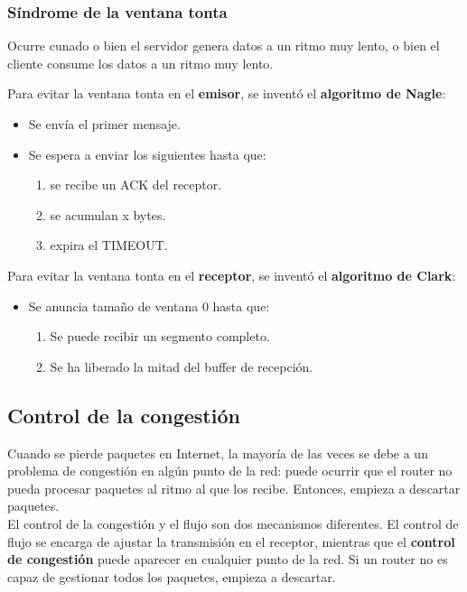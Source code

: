\subsubsection{Síndrome de la ventana tonta}
Ocurre cunado o bien el servidor genera datos a un ritmo muy lento, o bien el cliente consume los datos a un ritmo muy lento.\\
\begin{tcolorbox}[colback=white]
Para evitar la ventana tonta en el \textbf{emisor}, se inventó el \textbf{algoritmo de Nagle}:
\begin{itemize}
    \item Se envía el primer mensaje.
    \item Se espera a enviar los siguientes hasta que:
    \begin{enumerate}
        \item se recibe un ACK del receptor.
        \item se acumulan x bytes.
        \item expira el TIMEOUT.
    \end{enumerate}
\end{itemize}
\end{tcolorbox}
\begin{tcolorbox}[colback=white]
Para evitar la ventana tonta en el \textbf{receptor}, se inventó el \textbf{algoritmo de Clark}:
\begin{itemize}
    \item Se anuncia tamaño de ventana 0 hasta que:
    \begin{enumerate}
        \item Se puede recibir un segmento completo.
        \item Se ha liberado la mitad del buffer de recepción.
    \end{enumerate}
\end{itemize}
\end{tcolorbox}


\subsection{Control de la congestión}
Cuando se pierde paquetes en Internet, la mayoría de las veces se debe a un problema de congestión en algún punto de la red: puede ocurrir que el router no pueda procesar paquetes al ritmo al que los recibe. Entonces, empieza a descartar paquetes.\\

El control de la congestión y el flujo son dos mecanismos diferentes. El control de flujo se encarga de ajustar la transmisión en el receptor, mientras que el \textbf{control de congestión} puede aparecer en cualquier punto de la red. Si un router no es capaz de gestionar todos los paquetes, empieza a descartar.\\

